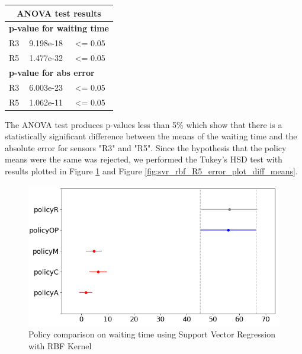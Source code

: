 \documentclass{mpaper}
\begin{document}
\begin{table}[h]
\centering
\begin{tabular}{|l|l|l|}
\hline
\multicolumn{3}{|c|}{\cellcolor[HTML]{DAE8FC}\textbf{ANOVA test results}}       \\ \hline
\multicolumn{3}{|l|}{\cellcolor[HTML]{FFFFFF}\textbf{p-value for waiting time}} \\ \hline
R3                 & 9.198e-18     & \textless{}= 0.05                           \\ \hline
R5                 & 1.477e-32    & \textless{}= 0.05                           \\ \hline
\multicolumn{3}{|l|}{\cellcolor[HTML]{FFFFFF}\textbf{p-value for abs error}}    \\ \hline
R3                 & 6.003e-23     & \textless{}= 0.05                           \\ \hline
R5                 & 1.062e-11    & \cellcolor[HTML]{FFFFFF}\textless{}= 0.05   \\ \hline
\end{tabular}
\end{table}

The ANOVA test produces p-values less than 5\% which show that there is a statistically significant difference between the means of the waiting time and the absolute error for sensors "R3" and "R5". Since the hypothesis that the policy means were the same was rejected, we performed the Tukey's HSD test with results plotted in Figure \ref{fig:svr_rbf_R5_waiting_plot_diff_means} and Figure \ref{fig:svr_rbf_R5_error_plot_diff_means}.

\begin{figure}[h]
    \centering
    \includegraphics[scale=0.35]{imgs/svr_rbf_R5_waiting_plot_diff_means.png}
    \caption{Policy comparison on waiting time using Support Vector Regression with RBF Kernel}
    \label{fig:svr_rbf_R5_waiting_plot_diff_means}
\end{figure}
\end{document}

